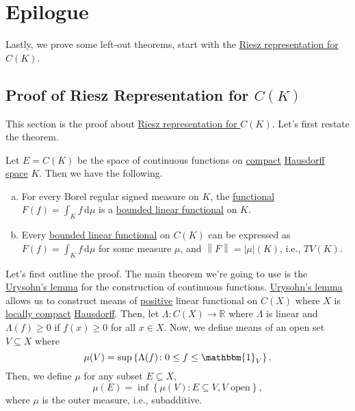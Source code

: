 \chapter{Epilogue}
Lastly, we prove some left-out theorems, start with the \hyperref[thm:Riesz-representation-for-C-K]{Riesz representation for \(C(K)\)}.

\section{Proof of Riesz Representation for \(C(K)\)}\label{pf:Riesz-representation-for-C-K}
This section is the proof about \hyperref[thm:Riesz-representation-for-C-K]{Riesz representation for \(C(K)\)}. Let's first restate the theorem.

\begin{prev}
	Let \(E = C(K)\) be the space of continuous functions on \hyperref[def:compact]{compact} \hyperref[def:Hausdorff]{Hausdorff space} \(K\). Then we have the following.
	\begin{enumerate}[(a)]
		\item For every Borel regular signed measure on \(K\), the \hyperref[def:linear-functional]{functional} \(F(f) = \int _K f\,\mathrm{d} \mu \) is a \hyperref[def:bounded-linear-functional]{bounded linear functional} on \(K\).
		\item Every \hyperref[def:bounded-linear-functional]{bounded linear functional} on \(C(K)\) can be expressed as \(F(f) = \int _K f\,\mathrm{d} \mu \) for some measure \(\mu \), and \(\left\lVert F\right\rVert = \left\vert \mu  \right\vert (K) \), i.e., \(TV(K)\).
	\end{enumerate}
\end{prev}
Let's first outline the proof. The main theorem we're going to use is the \hyperref[thm:Urysohn-lemma]{Urysohn's lemma} for the construction of continuous functions. \hyperref[thm:Urysohn-lemma]{Urysohn's lemma} allows us to construct means of \hyperref[def:positive-op]{positive} linear functional on \(C(X)\) where \(X\) is \hyperref[def:locally-compact]{locally compact} \hyperref[def:Hausdorff]{Hausdorff}. Then, let \(\Lambda \colon C(X) \to \mathbb{R} \) where \(\Lambda \) is linear and \(\Lambda (f) \geq 0\) if \(f(x) \geq 0\) for all \(x\in X\). Now, we define means of an open set \(V \subseteq X\) where
\[
	\mu (V) = \sup \left\{ \Lambda (f) \colon 0 \leq f \leq \mathbbm{1}_{V} \right\}.
\]
Then, we define \(\mu \) for any subset \(E \subseteq X\),
\[
	\mu (E) = \inf \left\{ \mu (V)\colon E \subseteq V, V \text{ open}  \right\},
\]
where \(\mu \) is the outer measure, i.e., subadditive.